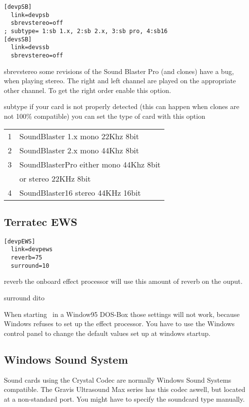 \begin{verbatim}
[devpSB]
  link=devpsb
  sbrevstereo=off
; subtype= 1:sb 1.x, 2:sb 2.x, 3:sb pro, 4:sb16
[devsSB]
  link=devssb
  sbrevstereo=off
\end{verbatim}
\begin{dojlist}
\item[sbrevstereo] some revisions of the Sound Blaster Pro (and clones) have
a bug, when playing stereo. The right and left channel are played on
the appropriate other channel. To get the right order enable this
option.
\item[subtype] if your card is not properly detected (this can happen when
clones are not 100\% compatible) you can set the type of card with this option\\
  \begin{tabular}{l@{ -- }l}
  1 & SoundBlaster 1.x mono 22Khz 8bit \\
  2 & SoundBlaster 2.x mono 44Khz 8bit \\
  3 & SoundBlasterPro either mono 44Khz 8bit \\
    & or stereo 22KHz 8bit \\
  4 & SoundBlaster16 stereo 44KHz 16bit \\
  \end{tabular}
\end{dojlist}

\subsection{Terratec EWS}
\begin{verbatim}
[devpEWS]
  link=devpews
  reverb=75    
  surround=10 
\end{verbatim}
\begin{dojlist}
\item[reverb] the onboard effect processor will use this amount of reverb on
the ouput.
\item[surround] dito
\end{dojlist}

When starting \cp\ in a Window95 DOS-Box those settings will not work,
because Windows refuses to set up the effect processor. You have to
use the Windows control panel to change the default values set up at
windows startup.

\subsection{Windows Sound System}
Sound cards using the Crystal Codec are normally Windows Sound Systems
compatible.  The Gravis Ultrasound Max series has this codec aswell,
but located at a non-standard port. You might have to specify the
soundcard type manually.

